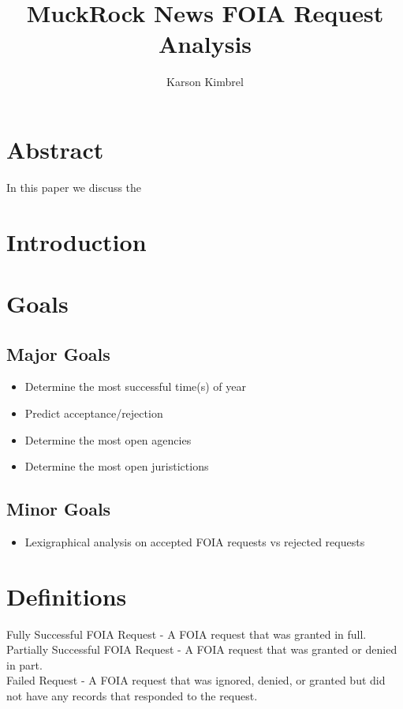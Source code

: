 \documentclass{article}
\title{MuckRock News FOIA Request Analysis}
\author{Karson Kimbrel}
\begin{document}
	\pagestyle{empty}
	
	\maketitle
	
	\section{Abstract}
	In this paper we discuss the 
	
	\section{Introduction}
	
	
	\section{Goals}
	
	
	\subsection{Major Goals}
		\begin{itemize}
			\item Determine the most successful time(s) of year
			\item Predict acceptance/rejection
			\item Determine the most open agencies
			\item Determine the most open juristictions
		\end{itemize}
	
	\subsection{Minor Goals}
		\begin{itemize}
			\item Lexigraphical analysis on accepted FOIA requests vs rejected requests
		\end{itemize}
	
	\section{Definitions}
		Fully Successful FOIA Request - A FOIA request that was granted in full.\\
		Partially Successful FOIA Request - A FOIA request that was granted or denied in part.\\
		Failed Request - A FOIA request that was ignored, denied, or granted but did not have any records that responded to the request.\\
	
\end{document}
